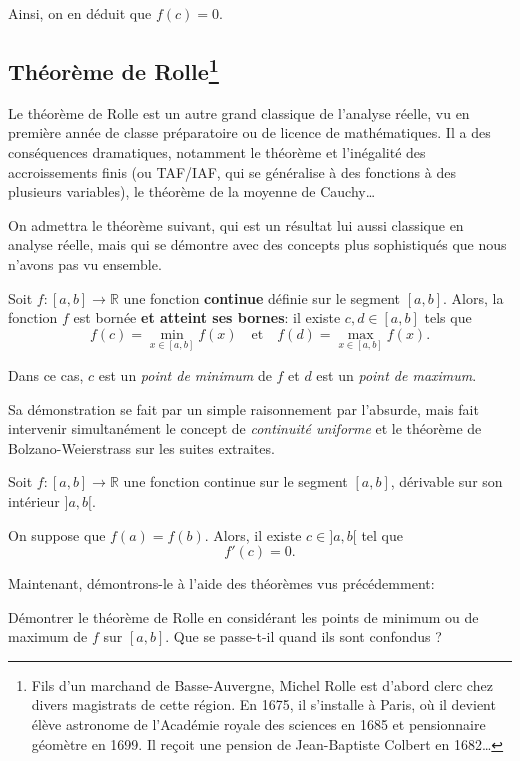 \documentclass[12pt]{article}
\newcommand{\RR}{\mathbb R}
\theoremstyle{definition}
\theoremstyle{theorem}
\theoremstyle{remark}
\begin{document}
Ainsi, on en déduit que $f(c) = 0$.

\subsection*{Théorème de Rolle\footnote{Fils d'un marchand de Basse-Auvergne, Michel Rolle est d'abord clerc chez divers magistrats de cette région. En 1675, il s'installe à Paris, où il devient élève astronome de l'Académie royale des sciences en 1685 et pensionnaire géomètre en 1699. Il reçoit une pension de Jean-Baptiste Colbert en 1682\ldots}}

Le théorème de Rolle est un autre grand classique de l'analyse réelle, vu en première année de classe préparatoire ou de licence de mathématiques. Il a des conséquences dramatiques, notamment le théorème et l'inégalité des accroissements finis (ou TAF/IAF, qui se généralise à des fonctions à des plusieurs variables), le théorème de la moyenne de Cauchy\ldots

On admettra le théorème suivant, qui est un résultat lui aussi classique en analyse réelle, mais qui se démontre avec des concepts plus sophistiqués que nous n'avons pas vu ensemble.

\begin{thm}
	Soit $f:[a,b]\longrightarrow\RR$ une fonction \textbf{continue} définie sur le segment $[a,b]$. Alors, la fonction $f$ est bornée \textbf{et atteint ses bornes}: il existe $c,d\in[a,b]$ tels que
	\[
	f(c) = \min_{x\in[a,b]} f(x)\quad\text{et}\quad f(d) = \max_{x\in[a,b]}f(x).
	\]
	
	Dans ce cas, $c$ est un \emph{point de minimum} de $f$ et $d$ est un \emph{point de maximum}.
\end{thm}

Sa démonstration se fait par un simple raisonnement par l'absurde, mais fait intervenir simultanément le concept de \textit{continuité uniforme} et le théorème de Bolzano-Weierstrass sur les suites extraites.

\begin{thm}
Soit $f:[a,b]\longrightarrow\RR$ une fonction continue sur le segment $[a,b]$, dérivable sur son intérieur $]a,b[$.

On suppose que $f(a) = f(b)$. Alors, il existe $c\in{]a,b[}$ tel que
\[
f'(c) = 0.
\]
\end{thm}


Maintenant, démontrons-le à l'aide des théorèmes vus précédemment:

\begin{exer}
Démontrer le théorème de Rolle en considérant les points de minimum ou de maximum de $f$ sur $[a,b]$. Que se passe-t-il quand ils sont confondus ?
\end{exer}
\end{document}
